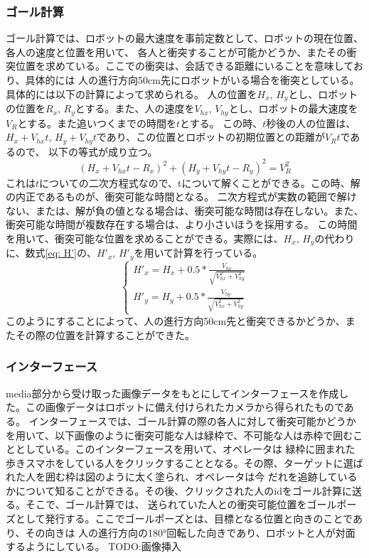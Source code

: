 \documentclass[11pt,a4j]{jreport}
\begin{document}
\subsubsection{ゴール計算}
ゴール計算では、ロボットの最大速度を事前定数として、ロボットの現在位置、各人の速度と位置を用いて、
各人と衝突することが可能かどうか、またその衝突位置を求めている。ここでの衝突は、会話できる距離にいることを意味しており、具体的には
人の進行方向50cm先にロボットがいる場合を衝突としている。具体的には以下の計算によって求められる。
人の位置を$H_x$, $H_y$とし、ロボットの位置を$R_x$, $R_y$とする。また、人の速度を$V_{hx}$, $V_{hy}$とし、ロボットの最大速度を$V_R$とする。また追いつくまでの時間を$t$とする。
この時、$t$秒後の人の位置は、$H_x + V_{hx}t$, $H_y + V_{hy}t$であり、この位置とロボットの初期位置との距離が$V_Rt$であるので、
以下の等式が成り立つ。\begin{equation}(H_x + V_{hx}t - R_x)^{2} + (H_y + V_{hy}t - R_y)^2 = V_R^2\end{equation}
これは$t$についての二次方程式なので、tについて解くことができる。この時、解の内正であるものが、衝突可能な時間となる。
二次方程式が実数の範囲で解けない、または、解が負の値となる場合は、衝突可能な時間は存在しない。また、衝突可能な時間が複数存在する場合は、より小さいほうを採用する。
この時間を用いて、衝突可能な位置を求めることができる。実際には、$H_x$, $H_y$の代わりに、数式\ref{eq: H'}の、$H'_x$, $H'_y$を用いて計算を行っている。
\begin{equation}
  \label{eq: H'}
\left\{\begin{array}{l}
H'_x = H_x + 0.5*\frac{V_{hx}}{\sqrt{{V_{hx}^2 + V_{hy}^2}}}\\
H'_y = H_y + 0.5 * \frac{V_{hy}}{\sqrt{V_{hx}^2 + V_{hy}^2}}
\end{array}\right.
\end{equation}
このようにすることによって、人の進行方向50cm先と衝突できるかどうか、またその際の位置を計算することができた。

\subsubsection{インターフェース}
media部分から受け取った画像データをもとにしてインターフェースを作成した。この画像データはロボットに備え付けられたカメラから得られたものである。
インターフェースでは、ゴール計算の際の各人に対して衝突可能かどうかを用いて、以下画像のように衝突可能な人は緑枠で、不可能な人は赤枠で囲むこととしている。このインターフェースを用いて、オペレータは
緑枠に囲まれた歩きスマホをしている人をクリックすることとなる。その際、ターゲットに選ばれた人を囲む枠は図のように太く塗られ、オペレータは今
だれを追跡しているかについて知ることができる。その後、クリックされた人のidをゴール計算に送る。そこで、ゴール計算では、
送られていた人との衝突可能位置をゴールポーズとして発行する。ここでゴールポーズとは、目標となる位置と向きのことであり、その向きは
人の進行方向の180°回転した向きであり、ロボットと人が対面するようにしている。
TODO:画像挿入
\end{document}
